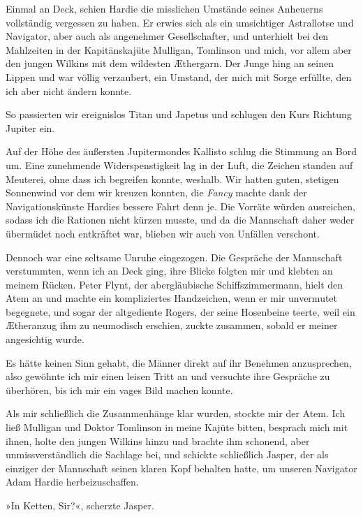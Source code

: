 Einmal an Deck, schien Hardie die misslichen Umstände seines
Anheuerns vollständig vergessen zu haben. Er erwies sich als ein
umsichtiger Astrallotse und Navigator, aber auch als angenehmer
Gesellschafter, und unterhielt bei den Mahlzeiten in der
Kapitänskajüte Mulligan, Tomlinson und mich, vor allem aber den
jungen Wilkins mit dem wildesten Æthergarn. Der Junge hing an
seinen Lippen und war völlig verzaubert, ein Umstand, der mich mit
Sorge erfüllte, den ich aber nicht ändern konnte.

\bigpar

So passierten wir ereignislos Titan und Japetus und schlugen den
Kurs Richtung Jupiter ein.

\bigpar

Auf der Höhe des äußersten Jupitermondes Kallisto schlug die
Stimmung an Bord um. Eine zunehmende Widerspenstigkeit lag in der
Luft, die Zeichen standen auf Meuterei, ohne dass ich begreifen
konnte, weshalb. Wir hatten guten, stetigen Sonnenwind vor dem wir
kreuzen konnten, die \emph{Fancy} machte dank der Navigationskünste
Hardies bessere Fahrt denn je. Die Vorräte würden ausreichen,
sodass ich die Rationen nicht kürzen musste, und da die Mannschaft
daher weder übermüdet noch entkräftet war, blieben wir auch von
Unfällen verschont.

Dennoch war eine seltsame Unruhe eingezogen. Die Gespräche der
Mannschaft verstummten, wenn ich an Deck ging, ihre Blicke folgten
mir und klebten an meinem Rücken. Peter Flynt, der abergläubische
Schiffszimmermann, hielt den Atem an und machte ein kompliziertes
Handzeichen, wenn er mir unvermutet begegnete, und sogar der
altgediente Rogers, der seine Hosenbeine teerte, weil ein
Ætheranzug ihm zu neumodisch erschien, zuckte zusammen, sobald er
meiner angesichtig wurde.

Es hätte keinen Sinn gehabt, die Männer direkt auf ihr Benehmen
anzusprechen, also gewöhnte ich mir einen leisen Tritt an und
versuchte ihre Gespräche zu überhören, bis ich mir ein vages Bild
machen konnte.

Als mir schließlich die Zusammenhänge klar wurden, stockte mir der
Atem. Ich ließ Mulligan und Doktor Tomlinson in meine Kajüte
bitten, besprach mich mit ihnen, holte den jungen Wilkins hinzu und
brachte ihm schonend, aber unmissverständlich die Sachlage bei, und
schickte schließlich Jasper, der als einziger der Mannschaft seinen
klaren Kopf behalten hatte, um unseren Navigator Adam Hardie
herbeizuschaffen.

»In Ketten, Sir?«, scherzte Jasper.

